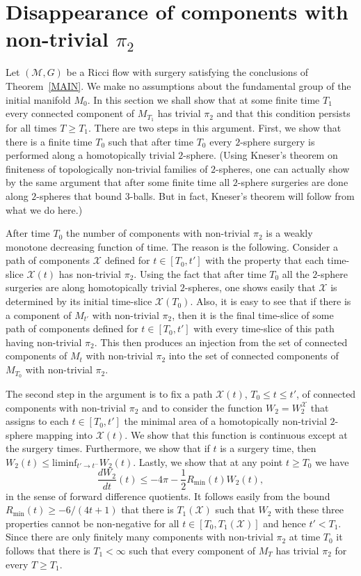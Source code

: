 \section{Disappearance of components with non-trivial $\pi_2$}

Let $({\mathcal M},G)$ be a Ricci flow with surgery satisfying the
conclusions of Theorem~\ref{MAIN}. We make no assumptions about the
fundamental group of the initial manifold $M_0$. In this section we
shall show that at some finite time $T_1$ every connected component
of $M_{T_1}$ has trivial $\pi_2$ and that this condition persists
for all times $T\ge T_1$. There are two steps in this argument.
First, we show that there is a finite time $T_0$ such that after
time $T_0$ every $2$-sphere surgery is performed along a
homotopically trivial $2$-sphere. (Using Kneser's theorem on
finiteness of topologically non-trivial families of $2$-spheres, one
can actually show by the same argument that after some finite time
all $2$-sphere surgeries are done along $2$-spheres that bound
$3$-balls. But in fact, Kneser's theorem will follow from what we do
here.)

After time $T_0$ the number of components with non-trivial $\pi_2$
is a weakly monotone decreasing function of time. The reason is the
following. Consider a path of components ${\mathcal X}$ defined for
$t\in [T_0,t']$ with the property that each time-slice ${\mathcal
X}(t)$ has non-trivial $\pi_2$. Using the fact that after time $T_0$
all the $2$-sphere surgeries are along homotopically trivial
$2$-spheres,  one shows easily that ${\mathcal X}$ is determined by
its initial time-slice ${\mathcal X}(T_0)$. Also, it is easy to see
that if there is a component of $M_{t'}$ with non-trivial $\pi_2$,
then it is the final time-slice of some path of components defined
for $t\in [T_0,t']$ with every time-slice of this path having
non-trivial $\pi_2$. This then produces an injection from the set of
connected components of $M_{t}$ with non-trivial $\pi_2$ into the
set of connected components of $M_{T_0}$ with non-trivial $\pi_2$.



The second step in the argument is to fix a path ${\mathcal X}(t)$,
$T_0\le t\le t'$, of connected components with non-trivial $\pi_2$
and to consider the function $W_2=W_2^{\mathcal X}$ that assigns to
each $t\in [T_0,t']$ the minimal area of a homotopically non-trivial
$2$-sphere mapping into ${\mathcal X}(t)$. We show that this
function is continuous except at the surgery times. Furthermore, we
show that if $t$ is a surgery time, then $W_2(t)\le \mathrm{liminf}_{t'\rightarrow t^-}W_2(t)$. Lastly, we show that at any
point $t\ge T_0$ we have
$$\frac{dW_2}{dt}(t)\le -4\pi-\frac{1}{2}R_{\min}(t)W_2(t),$$
in the sense of forward difference quotients. It follows easily from
the bound $R_{\min}(t)\ge -6/(4t+1)$ that there is $T_1({\mathcal
X})$  such that $W_2$ with these three properties cannot be
non-negative for all $t\in [T_0,T_1({\mathcal X})]$ and hence
$t'<T_1$. Since there are only finitely many components with
non-trivial $\pi_2$ at time $T_0$ it follows that there is
$T_1<\infty$ such that every component of $M_T$ has trivial $\pi_2$
for every $T\ge T_1$.


